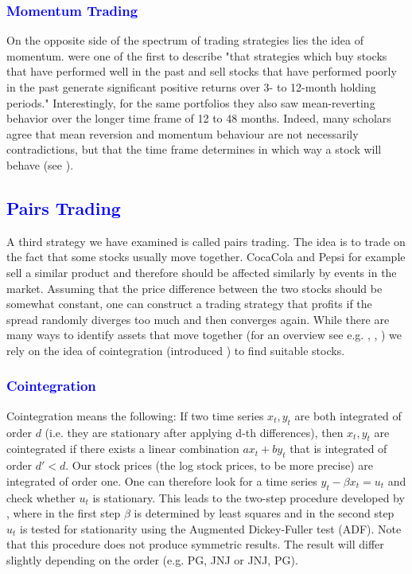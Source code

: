 \subsubsection{\textcolor{blue}{Momentum Trading}}
On the opposite side of the spectrum of trading strategies lies the idea of momentum. \cite{jegadeesh_returns_1993} were one of the first to describe "that strategies which buy stocks that have performed well in the past and sell stocks that have performed poorly in the past generate significant positive returns over 3- to 12-month holding periods."   Interestingly, for the same portfolios they also saw mean-reverting behavior over the longer time frame of 12 to 48 months. Indeed, many scholars agree that mean reversion and momentum behaviour are not necessarily contradictions, but that the time frame determines in which way a stock will behave (see \cite{balvers_momentum_2006}). 

\subsection{\textcolor{blue}{Pairs Trading}}
A third strategy we have examined is called pairs trading. The idea is to trade on the fact that some stocks usually move together. CocaCola and Pepsi for example sell a similar product and therefore should be affected similarly by events in the market. Assuming that the price difference between the two stocks should be somewhat constant, one can construct a trading strategy that profits if the spread randomly diverges too much and then converges again. While there are many ways to identify assets that move together (for an overview see e.g. \cite{gatev_pairs_1999}, \cite{ganapathy_vidyamurthy_pairs_2004}, \cite{do_new_2006}) we rely on the idea of cointegration (introduced \cite{engle_co-integration_1987}) to find suitable stocks. 

\subsubsection{\textcolor{blue}{Cointegration}}
Cointegration means the following: If two time series $x_t, y_t$ are both integrated of order $d$ (i.e. they are stationary after applying d-th differences), then $x_t, y_t$ are cointegrated if there exists a linear combination $a x_t + b y_t$ that is integrated of order $d' < d$. Our stock prices (the log stock prices, to be more precise) are integrated of order one. One can therefore look for a time series  $y_t - \beta x_t = u_t$ and check whether $u_t$ is stationary. This leads to the two-step procedure developed by \cite{engle_co-integration_1987}, where in the first step $\beta$ is determined by least squares and in the second step $u_t$ is tested for stationarity using the Augmented Dickey-Fuller test (ADF). Note that this procedure does not produce symmetric results. The result will differ slightly depending on the order (e.g. PG, JNJ or JNJ, PG). 


